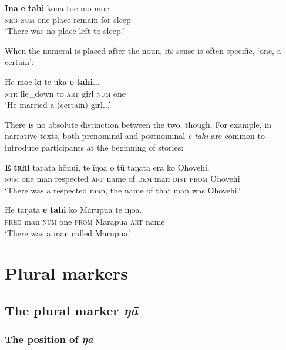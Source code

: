 \ea\label{ex:5.71}
\gll \textbf{{\ꞌ}Ina} \textbf{e} \textbf{tahi} kona toe mo moe. \\
\textsc{neg} \textsc{num} one place remain for sleep \\

\glt
‘There was no place left to sleep.’ \textstyleExampleref{[R339.027]} 
\z

When the numeral is placed after the noun, its sense is often specific, ‘one, a certain’: 

\ea\label{ex:5.72}
\gll He moe ki te uka \textbf{e} \textbf{tahi}... \\
\textsc{ntr} lie\_down to \textsc{art} girl \textsc{num} one \\

\glt
‘He married a (certain) girl...’ \textstyleExampleref{[Blx-3.002]}
\z

There is no absolute distinction between the two, though. For example, in narrative texts, both prenominal and postnominal \textit{e tahi} are common to introduce participants at the beginning of stories:

\ea\label{ex:5.73}
\gll \textbf{E} \textbf{tahi} taŋata hōnui, te {\ꞌ}īŋoa o tū taŋata era ko {\ꞌ}Ohovehi. \\
\textsc{num} one man respected \textsc{art} name of \textsc{dem} man \textsc{dist} \textsc{prom} Ohovehi \\

\glt 
‘There was a respected man, the name of that man was Ohovehi.’ \textstyleExampleref{[R310.001]} 
\z

\ea\label{ex:5.74}
\gll He taŋata \textbf{e} \textbf{tahi} ko Marupua te {\ꞌ}īŋoa. \\
\textsc{pred} man \textsc{num} one \textsc{prom} Marapua \textsc{art} name \\

\glt 
‘There was a man called Marupua.’ \textstyleExampleref{[R481.001]}\textstyleExampleref{} 
\z
{}
\section{Plural markers}\label{sec:5.5}
\subsection{The plural marker \textit{ŋā}}\label{sec:5.5.1}
\subsubsection[The position of ŋā]{The position of \textit{ŋā}}\label{sec:5.5.1.1}

